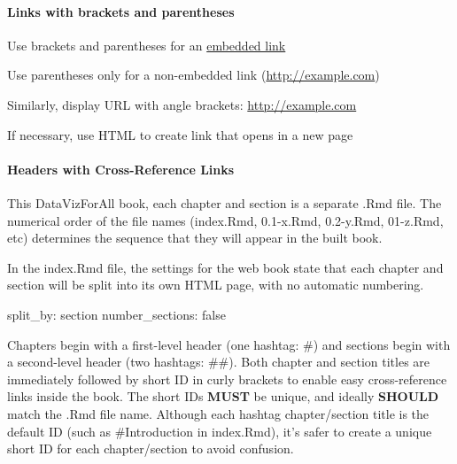 \documentclass[
  english,
]{book}
\newenvironment{Shaded}{\begin{snugshade}}{\end{snugshade}}
\newcommand{\NormalTok}[1]{#1}
\begin{document}
\hypertarget{links-with-brackets-and-parentheses}{%
\paragraph{Links with brackets and parentheses}\label{links-with-brackets-and-parentheses}}

Use brackets and parentheses for an \href{http://example.com}{embedded link}

Use parentheses only for a non-embedded link (\url{http://example.com})

Similarly, display URL with angle brackets: \url{http://example.com}

If necessary, use HTML to create link that opens in a new page

\hypertarget{headers-with-cross-reference-links}{%
\paragraph{Headers with Cross-Reference Links}\label{headers-with-cross-reference-links}}

This DataVizForAll book, each chapter and section is a separate .Rmd file. The numerical order of the file names (index.Rmd, 0.1-x.Rmd, 0.2-y.Rmd, 01-z.Rmd, etc) determines the sequence that they will appear in the built book.

In the index.Rmd file, the settings for the web book state that each chapter and section will be split into its own HTML page, with no automatic numbering.

\begin{Shaded}
\begin{Highlighting}[]
\NormalTok{split\_by: section}
\NormalTok{number\_sections: false}
\end{Highlighting}
\end{Shaded}

Chapters begin with a first-level header (one hashtag: \#) and sections begin with a second-level header (two hashtags: \#\#). Both chapter and section titles are immediately followed by short ID in curly brackets to enable easy cross-reference links inside the book. The short IDs \textbf{MUST} be unique, and ideally \textbf{SHOULD} match the .Rmd file name. Although each hashtag chapter/section title is the default ID (such as \#Introduction in index.Rmd), it's safer to create a unique short ID for each chapter/section to avoid confusion.
\end{document}
